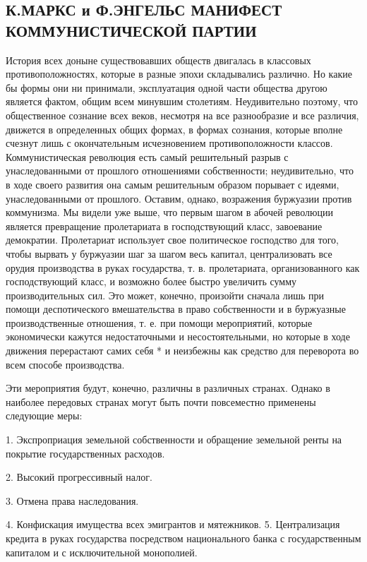 \documentclass[12pt]{article}
\newcommand{\parnum}{(\arabic{parcount})}
\newcounter{parcount}
\newenvironment{parnumbers}{%
  \par%
  \everypar{\noindent \stepcounter{parcount}\marginpar[]{\parnum}}%
}{}
\begin{document}
\subsection{К.МАРКС и Ф.ЭНГЕЛЬС  МАНИФЕСТ КОММУНИСТИЧЕСКОЙ ПАРТИИ}
\begin{parnumbers}
История всех доныне существовавших обществ двигалась в классовых противоположностях, которые в разные эпохи складывались различно. Но какие бы формы они ни принимали, эксплуатация одной части общества другою является фактом, общим всем минувшим столетиям. Неудивительно поэтому, что общественное сознание всех веков, несмотря на все разнообразие и все различия, движется в определенных общих формах, в формах сознания, которые вполне счезнут лишь с окончательным исчезновением противоположности классов. Коммунистическая революция есть самый решительный разрыв с унаследованными от прошлого отношениями собственности; неудивительно, что в ходе своего развития она самым решительным образом порывает с идеями, унаследованными от прошлого. Оставим, однако, возражения буржуазии против коммунизма. Мы видели уже выше, что первым шагом в абочей революции является превращение пролетариата в господствующий класс, завоевание демократии. Пролетариат использует свое политическое господство для того, чтобы вырвать у буржуазии шаг за шагом весь капитал, централизовать все орудия производства в руках государства, т. в. пролетариата, организованного как господствующий класс, и возможно более быстро увеличить сумму производительных сил. Это может, конечно, произойти сначала лишь при помощи деспотического вмешательства в право собственности и в буржуазные производственные отношения, т. е. при помощи мероприятий, которые экономически кажутся недостаточными и несостоятельными, но которые в ходе движения перерастают самих себя * и неизбежны как средство для переворота во всем способе производства.

Эти мероприятия будут, конечно, различны в различных странах. Однако в наиболее передовых странах могут быть почти повсеместно применены следующие меры:
\end{parnumbers}

1. Экспроприация земельной собственности и обращение земельной ренты на покрытие государственных расходов.

2. Высокий прогрессивный налог.

3. Отмена права наследования.

4. Конфискация имущества всех эмигрантов и мятежников. 5. Централизация кредита в руках государства посредством национального банка с государственным капиталом и с исключительной монополией.
\end{document}
